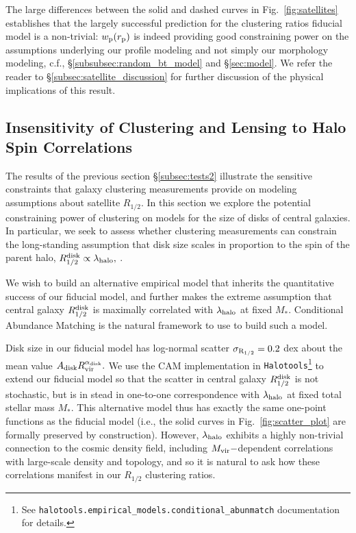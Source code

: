 \documentclass[usenatbib,usegraphicx,letterpaper]{mn2e}
\newcommand{\rhalf}{R_{1/2}}
\newcommand{\rhalfdisk}{R_{1/2}^{\rm disk}}
\newcommand{\adisk}{A_{\rm disk}}
\newcommand{\alphadisk}{\alpha_{\rm disk}}
\newcommand{\sigmarhalf}{\sigma_{\rm R_{1/2}}}
\newcommand{\mstar}{M_{\ast}}
\newcommand{\halospin}{\lambda_{\rm halo}}
\newcommand{\mvir}{M_{\rm vir}}
\newcommand{\rvir}{R_{\rm vir}}
\newcommand{\rproj}{r_{\rm p}}
\newcommand{\wproj}{w_{\rm p}}
\begin{document}
The large differences between the solid and dashed curves in Fig.~\ref{fig:satellites} establishes that the largely successful prediction for the clustering ratios fiducial model is a non-trivial: $\wproj(\rproj)$ is indeed providing good constraining power on the  assumptions underlying our profile modeling and not simply our morphology modeling, c.f., \S\ref{subsubsec:random_bt_model} and \S\ref{sec:model}. We refer the reader to \S\ref{subsec:satellite_discussion} for further discussion of the physical implications of this result.

\subsection{Insensitivity of Clustering and Lensing to Halo Spin Correlations}
\label{subsec:tests3}

The results of the previous section \S\ref{subsec:tests2} illustrate the sensitive constraints that galaxy clustering measurements provide on modeling assumptions about satellite $\rhalf.$ In this section we explore the potential constraining power of clustering on models for the size of disks of central galaxies. In particular, we seek to assess whether clustering measurements can constrain the long-standing assumption that disk size scales in proportion to the spin of the parent halo, $\rhalfdisk\propto\halospin,$ \citep[e.g.,][]{mo_mao_white98}.

We wish to build an alternative empirical model that inherits the quantitative success of our fiducial model, and further makes the extreme assumption that central galaxy $\rhalfdisk$ is maximally correlated with $\halospin$ at fixed $\mstar.$ Conditional Abundance Matching \citep[hereafter, CAM,][]{hearin_etal13b} is the natural framework to use to build such a model.

Disk size in our fiducial model has log-normal scatter $\sigmarhalf=0.2$ dex about the mean value $\adisk\rvir^{\alphadisk}.$  We use the CAM implementation in {\tt Halotools}\footnote{See {\tt halotools.empirical\_models.conditional\_abunmatch} documentation for details.} to extend our fiducial model so that the scatter in central galaxy $\rhalfdisk$ is not stochastic, but is in stead in one-to-one correspondence with $\halospin$ at fixed total stellar mass $\mstar.$ This alternative model thus has exactly the same one-point functions as the fiducial model (i.e., the solid curves in Fig.~\ref{fig:scatter_plot} are formally preserved by construction). However, $\halospin$ exhibits a highly non-trivial connection to the cosmic density field, including $\mvir-$dependent correlations with large-scale density and topology, and so it is natural to ask how these correlations manifest in our $\rhalf$ clustering ratios.
\end{document}
